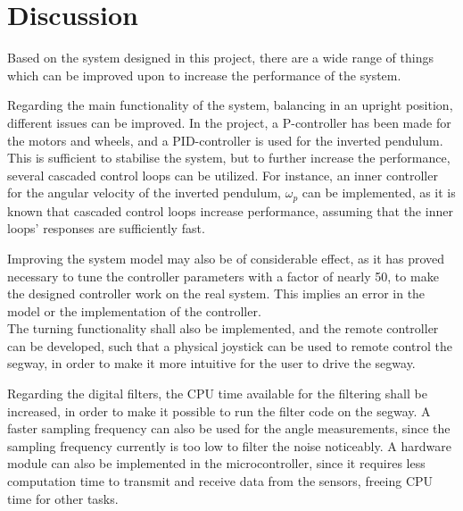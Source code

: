 \chapter{Discussion}
Based on the system designed in this project, there are a wide range of things which can be improved upon to increase the performance of the system.

Regarding the main functionality of the system, balancing in an upright position, different issues can be improved. In the project, a P-controller has been made for the motors and wheels, and a PID-controller is used for the inverted pendulum. This is sufficient to stabilise the system, but to further increase the performance, several cascaded control loops can be utilized. For instance, an inner controller for the angular velocity of the inverted pendulum, $\omega_p$ can be implemented, as it is known that cascaded control loops increase performance, assuming that the inner loops' responses are sufficiently fast.




Improving the system model may also be of considerable effect, as it has proved necessary to tune the controller parameters with a factor of nearly 50, to make the designed controller work on the real system. This implies an error in the model or the implementation of the controller.\\
The turning functionality shall also be implemented, and the remote controller can be developed, such that a physical joystick can be used to remote control the segway, in order to make it more intuitive for the user to drive the segway.

Regarding the digital filters, the CPU time available for the filtering shall be increased, in order to make it possible to run the filter code on the segway. A faster sampling frequency can also be used for the angle measurements, since the sampling frequency currently is too low to filter the noise noticeably.
A hardware \iic  module can also be implemented in the microcontroller, since it requires less computation time to transmit and receive data from the sensors, freeing CPU time for other tasks.


